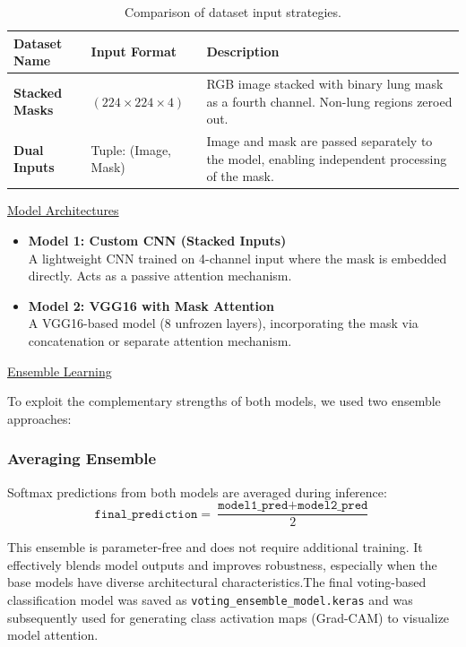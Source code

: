 \documentclass{article}
\begin{document}
\begin{table}[H]
\centering
\begin{tabular}{|l|l|p{8cm}|}
\hline
\textbf{Dataset Name} & \textbf{Input Format} & \textbf{Description} \\
\hline
\textbf{Stacked Masks} & $(224 \times 224 \times 4)$ & RGB image stacked with binary lung mask as a fourth channel. Non-lung regions zeroed out. \\
\hline
\textbf{Dual Inputs} & Tuple: (Image, Mask) & Image and mask are passed separately to the model, enabling independent processing of the mask. \\
\hline
\end{tabular}
\caption{Comparison of dataset input strategies.}
\end{table}

\vspace{10 mm}
\underline{Model Architectures}

\begin{itemize}
  \item \textbf{Model 1: Custom CNN (Stacked Inputs)}\\
  A lightweight CNN trained on 4-channel input where the mask is embedded directly. Acts as a passive attention mechanism.
  
  \item \textbf{Model 2: VGG16 with Mask Attention}\\
  A VGG16-based model (8 unfrozen layers), incorporating the mask via concatenation or separate attention mechanism.
\end{itemize}

\underline{Ensemble Learning}

To exploit the complementary strengths of both models, we used two ensemble approaches:

\subsubsection*{Averaging Ensemble}
Softmax predictions from both models are averaged during inference:
\[
\texttt{final\_prediction} = \frac{\texttt{model1\_pred} + \texttt{model2\_pred}}{2}
\]

This ensemble is parameter-free and does not require additional training. It effectively blends model outputs and improves robustness, especially when the base models have diverse architectural characteristics.The final voting-based classification model was saved as \texttt{voting\_ensemble\_model.keras} and was subsequently used for generating class activation maps (Grad-CAM) to visualize model attention.
\end{document}

